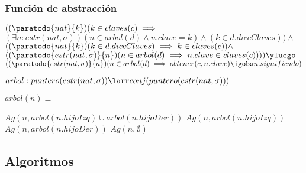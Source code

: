\subsubsection*{Función de abstracción}
$((\paratodo{nat}{k})( k \in claves(c) \implies $\\$(\exists n: estr(nat, \sigma))(n \in arbol(d) \land n.clave = k) \land (k \in d.diccClaves)) \land $\\$((\paratodo{nat}{k})(k \in d.diccClaves) \implies k \in claves(c)) \land $\\$ ((\paratodo{estr(nat, \sigma)}{n})(n \in arbol(d) \implies n.clave \in claves(c)))) \yluego $\\$((\paratodo{estr(nat, \sigma)}{n})(n \in arbol(d) \implies obtener(c,n.clave) \igobs n.significado)$
  
$arbol: puntero(estr(nat, \sigma)) \larr conj(puntero(estr(nat, \sigma)))$

$arbol(n) \equiv $
\begin{algorithmic}
	\State $Ag(n, arbol(n.hijoIzq) \cup arbol(n.hijoDer))$
\Else
		\State $Ag(n,arbol(n.hijoIzq))$
	\Else
		\State $Ag(n,arbol(n.hijoDer))$ 
		\Else 
		\State $Ag(n,\emptyset)$ 
		\EndIf
	\EndIf
\EndIf
\end{algorithmic}
		


\subsection{Algoritmos}




